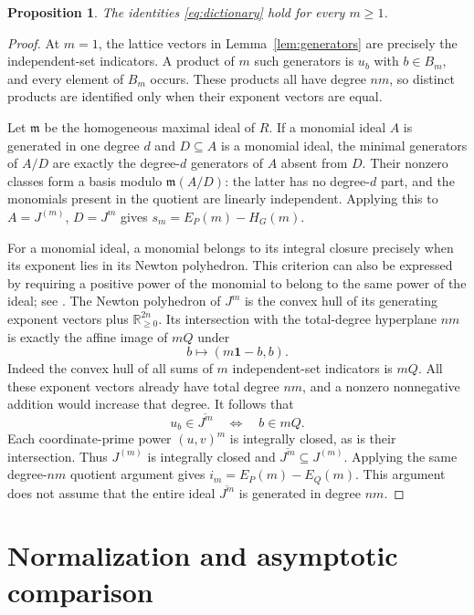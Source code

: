 \documentclass[11pt]{article}
\newtheorem{proposition}[theorem]{Proposition}
\theoremstyle{remark}
\newcommand{\RR}{\mathbb R}
\newcommand{\one}{\mathbf 1}
\begin{document}
\begin{proposition}\label{prop:dictionary}
The identities \eqref{eq:dictionary} hold for every $m\geq1$.
\end{proposition}
\begin{proof}
At $m=1$, the lattice vectors in Lemma~\ref{lem:generators} are precisely
the independent-set indicators. A product of $m$ such generators is
$u_b$ with $b\in B_m$, and every element of $B_m$ occurs. These products
all have degree $nm$, so distinct products are identified only when their
exponent vectors are equal.

Let $\mathfrak m$ be the homogeneous maximal ideal of $R$. If a monomial
ideal $A$ is generated in one degree $d$ and $D\subseteq A$ is a monomial
ideal, the minimal generators of $A/D$ are exactly the degree-$d$
generators of $A$ absent from $D$. Their nonzero classes form a basis
modulo $\mathfrak m(A/D)$: the latter has no degree-$d$ part, and the
monomials present in the quotient are linearly independent. Applying this
to $A=J^{(m)}$, $D=J^m$ gives $s_m=E_P(m)-H_G(m)$.

For a monomial ideal, a monomial belongs to its integral closure precisely
when its exponent lies in its Newton polyhedron. This criterion can also
be expressed by requiring a positive power of the monomial to belong to
the same power of the ideal; see \cite[Proposition~2.13]{Oltsik}.
The Newton polyhedron of $J^m$ is the convex hull of its generating
exponent vectors plus $\RR_{\geq0}^{2n}$. Its intersection with the
total-degree hyperplane $nm$ is exactly the affine image of $mQ$ under
\begin{equation}\label{eq:affine}
b\longmapsto(m\one-b,b).
\end{equation}
Indeed the convex hull of all sums of $m$ independent-set indicators is
$mQ$. All these exponent vectors already have total degree $nm$, and a
nonzero nonnegative addition would increase that degree. It follows that
\[
u_b\in\overline{J^m}\quad\Longleftrightarrow\quad b\in mQ.
\]
Each coordinate-prime power $(u,v)^m$ is integrally closed, as is their
intersection. Thus $J^{(m)}$ is integrally closed and
$\overline{J^m}\subseteq J^{(m)}$. Applying the same degree-$nm$ quotient
argument gives $i_m=E_P(m)-E_Q(m)$. This argument does not assume that the
entire ideal $\overline{J^m}$ is generated in degree $nm$.
\end{proof}

\section{Normalization and asymptotic comparison}
\end{document}
